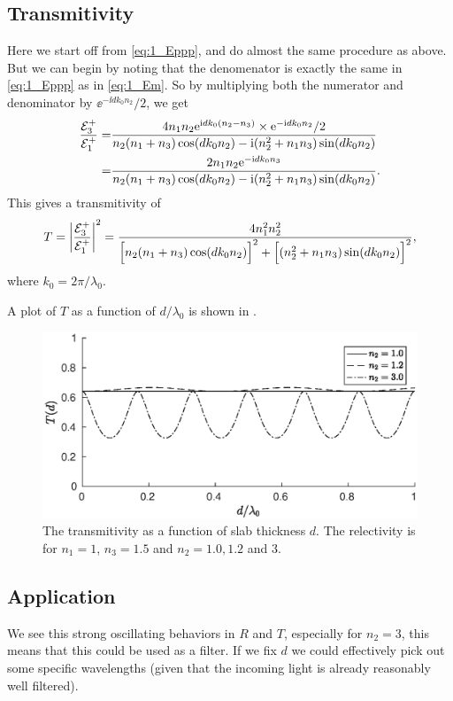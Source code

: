 \documentclass[11pt,letter, swedish, english
]{article}
\begin{document}
\subsection{Transmitivity}
Here we start off from \eqref{eq:1_Eppp}, and do almost the same
procedure as above. But we can begin by noting that the denomenator is
exactly the same in \eqref{eq:1_Eppp} as in \eqref{eq:1_Em}. So by
multiplying both the numerator and denominator by $\ee^{-\ii dk_0n_2}/2$,
we get
\begin{equation}
\begin{aligned}
\frac{{\mathcal{E}_3^+}}{{\mathcal{E}_1^+}} =&
\frac{
4n_1n_2 \mathrm{e}^{\mathrm{i} d k_0(n_2-n_3)} \times \mathrm{e}^{-\mathrm{i} dk_0n_2}/2
}{n_2(n_1 +n_3)\cos(dk_0n_2) - \mathrm{i}(n_2^2 +n_1n_3)\sin(dk_0n_2) 
}\\
=&
\frac{
2n_1n_2 \mathrm{e}^{-\mathrm{i} d k_0n_3} 
}{n_2(n_1 +n_3)\cos(dk_0n_2) - \mathrm{i}(n_2^2 +n_1n_3)\sin(dk_0n_2) 
}.
\end{aligned}
\end{equation}
This gives a transmitivity of
\begin{equation}
T = \abs{\frac{{\mathcal{E}_3^+}}{{\mathcal{E}_1^+}}}^2 = 
\frac{
4n_1^2n_2^2
}{
\Big[n_2(n_1 +n_3)\cos(dk_0n_2)\Big]^2 
+\Big[(n_2^2 +n_1n_3)\sin(dk_0n_2)\Big]^2 
},
\end{equation}
where $k_0=2\pi/\lambda_0$.

A plot of $T$ as a function of $d/\lambda_0$ is shown in
. 



\begin{figure}
\centering
\includegraphics[width=.9\textwidth]{1b_T.eps}
\caption{The transmitivity as a function of slab thickness $d$. The
  relectivity is for $n_1=1$, $n_3=1.5$ and $n_2=1.0, 1.2$ and 3.}
\label{fig:1b_T}
\end{figure}


\subsection{Application}
We see this strong oscillating behaviors in $R$ and $T$, especially
for $n_2=3$, this means that this could be used as a filter. If we fix
$d$ we could effectively pick out some specific wavelengths (given
that the incoming light is already reasonably well filtered). 
\end{document}
